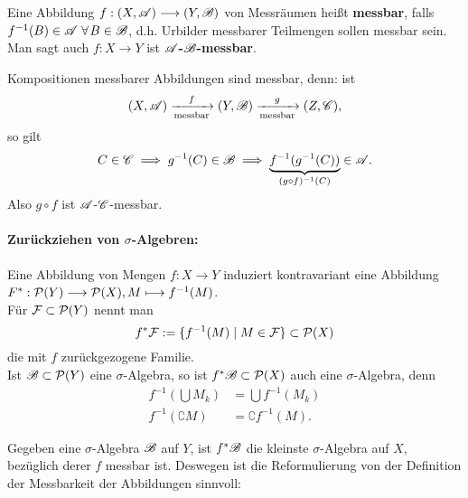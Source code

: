 \begin{definition}
\begin{mdframed}
Eine Abbildung $f:(X,\AA) \longrightarrow (Y,\BB)$ von Messräumen heißt \textbf{messbar}, falls $f^{-1}(B) \in \AA \ \forall B \in \BB$, d.h. Urbilder messbarer Teilmengen sollen messbar sein. Man sagt auch $f:X\longrightarrow Y$ ist \textbf{$\AA$-$\BB$-messbar}.
\end{mdframed}
\end{definition}

\begin{beobachtung}
Kompositionen messbarer Abbildungen sind messbar, denn: ist
$$(X,\AA)\xrightarrow[\text{messbar}]{f} (Y,\BB) \xrightarrow[\text{messbar}]{g} (Z,\CC),$$
so gilt
$$C\in \CC \implies g^{-1}(C) \in \BB \implies \underbrace{f^{-1}(g^{-1}(C))}_{(g\circ f)^{-1}(C)} \in \AA.$$
Also $g\circ f$ ist $\AA$-$\CC$-messbar.
\end{beobachtung}

\paragraph{Zurückziehen von $\sigma$-Algebren:}
Eine Abbildung von Mengen $f:X \longrightarrow Y$ induziert kontravariant eine Abbildung $F^*:\PP(Y)\longrightarrow\PP(X), M \longmapsto f^{-1}(M)$. \\
Für $\FF \subset \PP(Y)$ nennt man
$$f^* \FF := \{f^{-1}(M) \mid M \in \FF \} \subset \PP(X)$$
die mit $f$ zurückgezogene Familie.\\
Ist $\BB\subset \PP(Y)$ eine $\sigma$-Algebra, so ist $f^*\BB \subset \PP(X)$ auch eine $\sigma$-Algebra, denn
\begin{equation*}
\begin{split}
	f^{-1} \left(\bigcup M_k\right) & = \bigcup f^{-1}(M_k) \\
	f^{-1}\left(\complement M\right) & = \complement f^{-1}(M).
\end{split}
\end{equation*}

\begin{beobachtung}
Gegeben eine $\sigma$-Algebra $\BB$ auf $Y$, ist $f^*\BB$ die kleinste $\sigma$-Algebra auf $X$, bezüglich derer $f$ messbar ist. Deswegen ist die Reformulierung von der Definition der Messbarkeit der Abbildungen sinnvoll:
\end{beobachtung}


